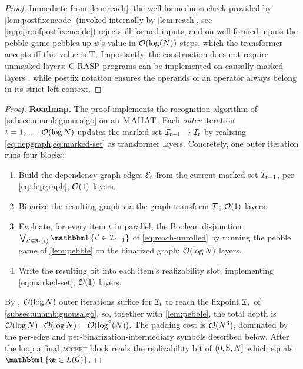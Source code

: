 \documentclass{article}
\begin{document}
\bfvpcorr*
\begin{proof}\label{app:proofbfvp}
    Immediate from \cref{lem:reach}: the well-formedness check provided by \cref{lem:postfixencode} (invoked internally by \cref{lem:reach}, see \cref{app:proofpostfixencode}) rejects ill-formed inputs, and on well-formed inputs the pebble game pebbles up $\psi$'s value in ${{ \mathcal{O}}}(\log({{ N}}))$ steps, which the transformer accepts iff this value is ${\mathbin{\mathrm{T}}}$.
    Importantly, the construction does not require unmasked layers: C-RASP programs can be implemented on causally-masked layers \citep{yang2024countingliketransformerscompiling}, while postfix notation ensures the operands of an operator always belong in its strict left context.   
\end{proof}

\ucfltoahat*
\begin{proof}\label{app:proofucfl2ahat}
    \textbf{Roadmap.} The proof implements the recognition algorithm of \cref{subsec:unambiguousalgo} on an ${{\textsc{MAHAT}}}$. Each \emph{outer} iteration $t = 1, \ldots, {{ \mathcal{O}}}(\log {{ N}})$ updates the marked set ${{\mathcal{I}}}_{t-1} \to {{\mathcal{I}}}_t$ by realizing \cref{eq:depgraph,eq:marked-set} as transformer layers. Concretely, one outer iteration runs four blocks:
    \begin{enumerate}[label=\textit{(\arabic*)},topsep=0pt,noitemsep]
        \item Build the dependency-graph edges ${\mathcal{E}}_t$ from the current marked set ${{\mathcal{I}}}_{t-1}$, per \cref{eq:depgraph}; ${{ \mathcal{O}}}(1)$ layers.
        \item Binarize the resulting graph via the graph transform ${{ \mathcal{T}}}$; ${{ \mathcal{O}}}(1)$ layers.
        \item Evaluate, for every item ${{ \iota}}$ in parallel, the Boolean disjunction $\bigvee_{\itm' \in \reachable_t(\itm)} \ind{\itm' \in \items_{t-1}}$ of \cref{eq:reach-unrolled} by running the pebble game of \cref{lem:pebble} on the binarized graph; ${{ \mathcal{O}}}(\log {{ N}})$ layers.
        \item Write the resulting bit into each item's realizability slot, implementing \cref{eq:marked-set}; ${{ \mathcal{O}}}(1)$ layers.
    \end{enumerate}
    By \citet{chytil-unambiguous}, ${{ \mathcal{O}}}(\log {{ N}})$ outer iterations suffice for ${{\mathcal{I}}}_t$ to reach the fixpoint ${{\mathcal{I}}}_*$ of \cref{subsec:unambiguousalgo}, so, together with \cref{lem:pebble}, the total depth is ${{ \mathcal{O}}}(\log {{ N}}) \cdot {{ \mathcal{O}}}(\log {{ N}}) = {{ \mathcal{O}}}(\log^2({{ N}}))$. The padding cost is ${{ \mathcal{O}}}({{ N}}^3)$, dominated by the per-edge and per-binarization-intermediary symbols described below. After the loop a final \textsc{accept} block reads the realizability bit of $(0, {{ \mathrm{S}}}, {{ N}}]$ which equals $\ind{\str \in \lang(\grammar)}$.
    

\end{proof}
\end{document}
